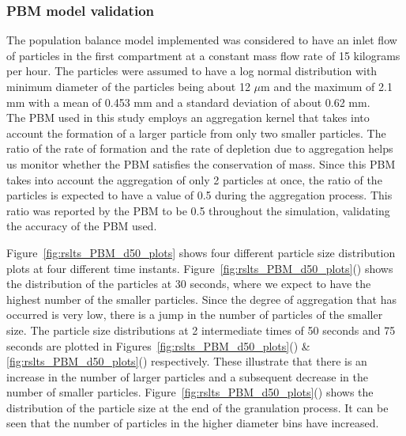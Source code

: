 \documentclass[preprint,11pt,authoryear]{elsarticle}
\begin{document}
\subsubsection{PBM model validation}
 The population balance model implemented was considered to have an inlet flow of particles in the 
first compartment at a constant mass flow rate of 15 kilograms per hour. The particles were assumed 
to have a log normal distribution with minimum diameter of the particles being about 12 $\mu$m and the 
maximum of 2.1 mm with a mean of 0.453 mm and a standard deviation of about 0.62 mm. \\
The PBM used in this study employs an aggregation kernel that takes into account the formation of a 
larger particle from only two smaller particles. The ratio of the rate of formation and the rate of 
depletion due to aggregation helps us monitor whether the PBM satisfies the conservation of mass. 
Since this PBM takes into account the aggregation of only 2 particles at once, the ratio of the particles 
is expected to have a value of 0.5 during the aggregation process. This ratio was reported by the PBM 
to be 0.5 throughout the simulation, validating the accuracy of the PBM used.

Figure~\ref{fig:rslts_PBM_d50_plots} shows four different particle size distribution plots at four 
different time instants. Figure~\ref{fig:rslts_PBM_d50_plots}() shows the distribution of 
the particles at 30 seconds, where we expect to have the highest number of the smaller particles. 
Since the degree of aggregation that has occurred is very low, there is a jump in the number of 
particles of the smaller size. The particle size distributions at 2 intermediate times of 50 seconds and 
75 seconds are plotted in Figures~\ref{fig:rslts_PBM_d50_plots}() \& \ref{fig:rslts_PBM_d50_plots}() respectively. These illustrate that there is an increase in 
the number of larger particles  and a subsequent decrease in the number of smaller particles. 
Figure~\ref{fig:rslts_PBM_d50_plots}() shows the distribution 
of the particle size at the end of the granulation process. It can be seen that the number of particles in 
the higher diameter bins have increased.
\end{document}
